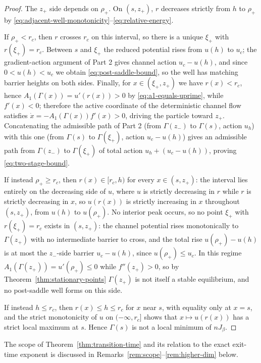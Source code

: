 \documentclass{opt2026} %
\newcommand{\prefactor}[2]{A_{#1}(#2)}
\begin{document}
\begin{proof}
    The $z_+$ side depends on $\rho_+$. On $(s,z_+)$, $r$ decreases strictly from $h$ to $\rho_+$ by \eqref{eq:adjacent-well-monotonicity}--\eqref{eq:relative-energy}.

    If $\rho_+<r_c$, then $r$ crosses $r_c$ on this interval, so there is a unique $\xi_+$ with $r(\xi_+)=r_c$. Between $s$ and $\xi_+$ the reduced potential rises from $u(h)$ to $u_c$; the gradient-action argument of Part 2 gives channel action $u_c-u(h)$, and since $0<u(h)<u_c$ we obtain \eqref{eq:post-saddle-bound}, so the well has matching barrier heights on both sides. Finally, for $x\in(\xi_+,z_+)$ we have $r(x)<r_c$, hence $\prefactor{1}{\Gamma(x)}=u'(r(x))>0$ by \eqref{eq:a1-equals-uprime}, while $f'(x)<0$; therefore the active coordinate of the deterministic channel flow satisfies $\dot x=-\prefactor{1}{\Gamma(x)}f'(x)>0$, driving the particle toward $z_+$. Concatenating the admissible path of Part 2 (from $\Gamma(z_-)$ to $\Gamma(s)$, action $u_h$) with this one (from $\Gamma(s)$ to $\Gamma(\xi_+)$, action $u_c-u(h)$) gives an admissible path from $\Gamma(z_-)$ to $\Gamma(\xi_+)$ of total action $u_h+(u_c-u(h))$, proving \eqref{eq:two-stage-bound}.

    If instead $\rho_+\ge r_c$, then $r(x)\in[r_c,h)$ for every $x\in(s,z_+)$: the interval lies entirely on the decreasing side of $u$, where $u$ is strictly decreasing in $r$ while $r$ is strictly decreasing in $x$, so $u(r(x))$ is strictly increasing in $x$ throughout $(s,z_+)$, from $u(h)$ to $u(\rho_+)$. No interior peak occurs, so no point $\xi_+$ with $r(\xi_+)=r_c$ exists in $(s,z_+)$: the channel potential rises monotonically to $\Gamma(z_+)$ with no intermediate barrier to cross, and the total rise $u(\rho_+)-u(h)$ is at most the $z_-$-side barrier $u_c-u(h)$, since $u(\rho_+)\le u_c$. In this regime $\prefactor{1}{\Gamma(z_+)}=u'(\rho_+)\le0$ while $f''(z_+)>0$, so by Theorem~\ref{thm:stationary-points} $\Gamma(z_+)$ is not itself a stable equilibrium, and no post-saddle well forms on this side.

    If instead $h\le r_c$, then $r(x)\le h\le r_c$ for $x$ near $s$, with equality only at $x=s$, and the strict monotonicity of $u$ on $(-\infty,r_c]$ shows that $x\mapsto u(r(x))$ has a strict local maximum at $s$. Hence $\Gamma(s)$ is not a local minimum of $nJ_\beta$.
\end{proof}

The scope of Theorem~\ref{thm:transition-time} and its relation to the exact exit-time exponent is discussed in Remarks~\ref{rem:scope}--\ref{rem:higher-dim} below.
\end{document}
